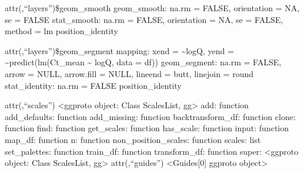 \documentclass[
]{article}
\begin{document}
attr(,``layers'')\$geom\_smooth geom\_smooth: na.rm = FALSE, orientation
= NA, se = FALSE stat\_smooth: na.rm = FALSE, orientation = NA, se =
FALSE, method = lm position\_identity

attr(,``layers'')\$geom\_segment mapping: xend = \textasciitilde logQ,
yend = \textasciitilde predict(lm(Ct\_mean \textasciitilde{} logQ, data
= df)) geom\_segment: na.rm = FALSE, arrow = NULL, arrow.fill = NULL,
lineend = butt, linejoin = round stat\_identity: na.rm = FALSE
position\_identity

attr(,``scales'') \textless ggproto object: Class ScalesList,
gg\textgreater{} add: function add\_defaults: function add\_missing:
function backtransform\_df: function clone: function find: function
get\_scales: function has\_scale: function input: function map\_df:
function n: function non\_position\_scales: function scales: list
set\_palettes: function train\_df: function transform\_df: function
super: \textless ggproto object: Class ScalesList, gg\textgreater{}
attr(,``guides'') \textless Guides{[}0{]} ggproto object\textgreater{}
\end{document}
